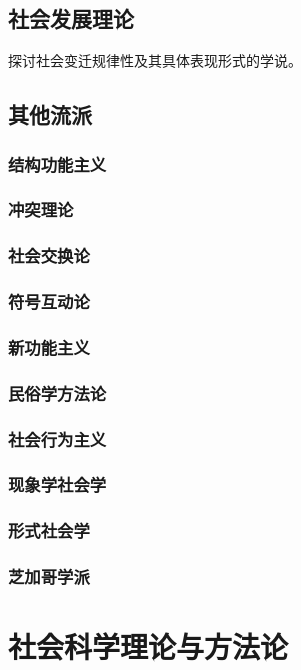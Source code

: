 \documentclass[UTF8]{../RepresentationUniverse}
\begin{document}
\section{社会发展理论}
探讨社会变迁规律性及其具体表现形式的学说。


\section{其他流派}

\subsection{结构功能主义}
\subsection{冲突理论}
\subsection{社会交换论}
\subsection{符号互动论}
\subsection{新功能主义}
\subsection{民俗学方法论}
\subsection{社会行为主义}
\subsection{现象学社会学}
\subsection{形式社会学}
\subsection{芝加哥学派}



\chapter{社会科学理论与方法论}
\end{document}

